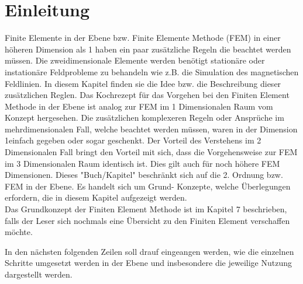 %
%
%
\section{Einleitung\label{fem:section:einleitung}}
Finite Elemente in der Ebene bzw. Finite Elemente Methode (FEM) in einer höheren Dimension als 1 haben ein paar zusätzliche Regeln die beachtet werden müssen. Die zweidimensionale Elemente werden benötigt stationäre oder instationäre Feldprobleme zu behandeln wie z.B. die Simulation des magnetischen Feldlinien. In diesem Kapitel finden sie die Idee bzw. die Beschreibung dieser zusätzlichen Reglen. Das Kochrezept für das Vorgehen bei den Finiten Element Methode in der Ebene ist analog zur FEM im 1 Dimensionalen Raum vom Konzept hergesehen. Die zusätzlichen komplexeren Regeln oder Ansprüche im mehrdimensionalen Fall, welche beachtet werden müssen, waren in der Dimension 1einfach gegeben oder sogar geschenkt. Der Vorteil des Verstehens im 2 Dimensionalen Fall bringt den Vorteil mit sich, dass die Vorgehensweise zur FEM im 3 Dimensionalen Raum identisch ist. Dies gilt auch für noch höhere FEM Dimensionen. Dieses  "Buch/Kapitel" beschränkt sich auf die 2. Ordnung bzw. FEM in der Ebene. Es handelt sich um Grund- Konzepte, welche Überlegungen erfordern, die in diesem Kapitel aufgezeigt werden.\\

Das Grundkonzept der Finiten Element Methode ist im Kapitel 7 beschrieben, falls der Leser sich nochmals eine Übersicht zu den Finiten Element verschaffen möchte.


In den nächsten folgenden Zeilen soll drauf eingeangen werden, wie die einzelnen Schritte umgesetzt werden in der Ebene und insbesondere die jeweilige Nutzung dargestellt werden.

